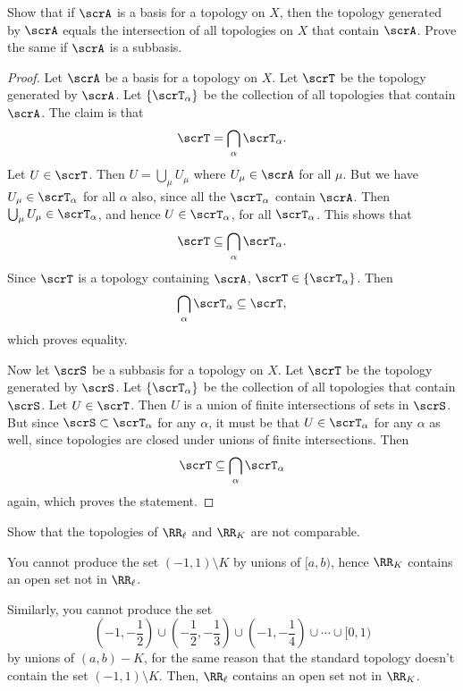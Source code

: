 \documentclass{article}
\begin{document}
\begin{exercise}
    Show that if $\scrA$ is a basis for a topology on $X$, then the topology generated by $\scrA$ equals the intersection of all topologies on $X$ that contain $\scrA$.
    Prove the same if $\scrA$ is a subbasis.
\end{exercise}

\begin{proof}
    Let $\scrA$ be a basis for a topology on $X$.
    Let $\scrT$ be the topology generated by $\scrA$.
    Let $\{\scrT_\alpha\}$ be the collection of all topologies that contain $\scrA$.
    The claim is that
    \[
        \scrT = \bigcap_\alpha \scrT_\alpha.
    \]
    Let $U \in \scrT$.
    Then $U = \bigcup_\mu U_\mu$ where $U_\mu \in \scrA$ for all $\mu$.
    But we have $U_\mu \in \scrT_\alpha$ for all $\alpha$ also, since all the $\scrT_\alpha$ contain $\scrA$.
    Then $\bigcup_\mu U_\mu \in \scrT_\alpha$, and hence $U \in \scrT_\alpha$, for all $\scrT_\alpha$.
    This shows that
    \[
        \scrT \subseteq \bigcap_\alpha \scrT_\alpha.
    \]
    Since $\scrT$ is a topology containing $\scrA$, $\scrT \in \{\scrT_\alpha\}$.
    Then
    \[
        \bigcap_\alpha \scrT_\alpha \subseteq \scrT,
    \]
    which proves equality.

    Now let $\scrS$ be a subbasis for a topology on $X$.
    Let $\scrT$ be the topology generated by $\scrS$.
    Let $\{\scrT_\alpha\}$ be the collection of all topologies that contain $\scrS$.
    Let $U \in \scrT$.
    Then $U$ is a union of finite intersections of sets in $\scrS$.
    But since $\scrS \subset \scrT_\alpha$ for any $\alpha$, it must be that $U \in \scrT_\alpha$ for any $\alpha$ as well, since topologies are closed under unions of finite intersections.
    Then
    \[
        \scrT \subseteq \bigcap_\alpha \scrT_\alpha
    \]
    again, which proves the statement.
\end{proof}

\begin{exercise}
    Show that the topologies of $\RR_\ell$ and $\RR_K$ are not comparable.
\end{exercise}

You cannot produce the set $(-1, 1) \setminus K$ by unions of $[a,b)$, hence $\RR_K$ contains an open set not in $\RR_\ell$.

Similarly, you cannot produce the set 
\[
    \left(-1, -\frac{1}{2}\right) 
    \cup \left(-\frac{1}{2}, -\frac{1}{3}\right) 
    \cup \left(-1, -\frac{1}{4}\right) 
    \cup \cdots
    \cup [0, 1)
\]
by unions of $(a,b) - K$, for the same reason that the standard topology doesn't contain the set $(-1,1) \setminus K$. Then, $\RR_\ell$ contains an open set not in $\RR_K$.
\end{document}
